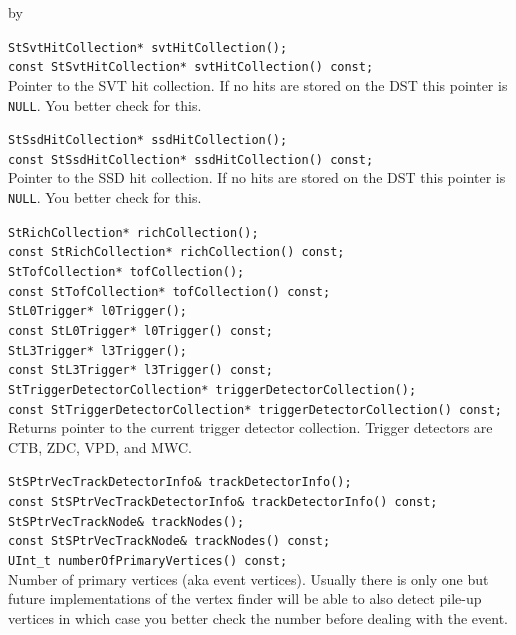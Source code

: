 \documentclass[twoside]{article}
\newcommand{\entrylabel}[1]{\mbox{\textbf{{#1}}}\hfil}%
\newenvironment{entry}
{\begin{list}{}%
    {\renewcommand{\makelabel}{\entrylabel}%
     \setlength{\labelwidth}{90pt}%
     \setlength{\leftmargin}{\labelwidth}
     \advance\leftmargin by \labelsep%
      }%
    }%
  {\end{list}}
\newcommand{\Entrylabel}[1]%
{\raisebox{0pt}[1ex][0pt]{\makebox[\labelwidth][l]%
    {\parbox[t]{\labelwidth}{\hspace{0pt}\textbf{{#1}}}}}}
\newenvironment{Entry}%
{\renewcommand{\entrylabel}{\Entrylabel}\begin{entry}}%
  {\end{entry}}
\begin{document}
\begin{Entry}
    \verb+StSvtHitCollection* svtHitCollection();+\\
    \verb+const StSvtHitCollection* svtHitCollection() const;+\\
    Pointer to the SVT hit collection. If no hits are stored on the
    DST this pointer is \texttt{NULL}. You better check for this.    

    \verb+StSsdHitCollection* ssdHitCollection();+\\
    \verb+const StSsdHitCollection* ssdHitCollection() const;+\\
    Pointer to the SSD hit collection. If no hits are stored on the
    DST this pointer is \texttt{NULL}. You better check for this.   

    \verb+StRichCollection* richCollection();+\\
    \verb+const StRichCollection* richCollection() const;+\\

    \verb+StTofCollection* tofCollection();+\\
    \verb+const StTofCollection* tofCollection() const;+\\

    \verb+StL0Trigger* l0Trigger();+\\
    \verb+const StL0Trigger* l0Trigger() const;+\\

    \verb+StL3Trigger* l3Trigger();+\\
    \verb+const StL3Trigger* l3Trigger() const;+\\

    \verb+StTriggerDetectorCollection* triggerDetectorCollection();+\\
    \verb+const StTriggerDetectorCollection* triggerDetectorCollection() const;+\\
    Returns pointer to the current trigger detector collection.
    Trigger detectors are CTB, ZDC, VPD, and MWC.
    
    \verb+StSPtrVecTrackDetectorInfo& trackDetectorInfo();+\\
    \verb+const StSPtrVecTrackDetectorInfo& trackDetectorInfo() const;+\\
    
    \verb+StSPtrVecTrackNode& trackNodes();+\\
    \verb+const StSPtrVecTrackNode& trackNodes() const;+\\
    
    \verb+UInt_t numberOfPrimaryVertices() const;+\\
    Number of primary vertices (aka event vertices).  Usually there is
    only one but future implementations of the vertex finder will be
    able to also detect pile-up vertices in which case you better
    check the number before dealing with the event.
    

\end{Entry}
\end{document}
